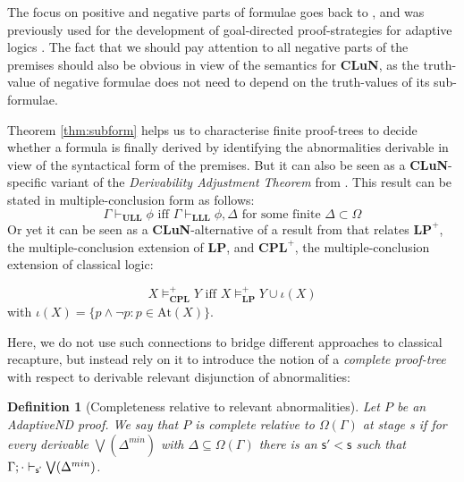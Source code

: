 \documentclass[]{article}
\newtheorem{definition}{Definition}
\newcommand{\TurnPrime}[2]
    { {#1}\vdash_{\textbf{\sf s'}}  {#2}}
\newcommand{\TurnPrimePrime}[2]
    { {#1}\vdash_{\textbf{\sf s''}}  {#2}}
\newcommand{\At}{\ensuremath{\mathrm{At}}}
\begin{document}
The focus on positive and negative parts of formulae goes back to \cite{Sch60}, and was previously used for the development of goal-directed proof-strategies for adaptive logics \cite{Batens:LogiqueAnalyse:2001}. The fact that we should pay attention to all negative parts of the premises should also be obvious in view of the semantics for \textbf{CLuN}, as the truth-value of negative formulae does not need to depend on the truth-values of its sub-formulae.

Theorem \ref{thm:subform} helps us to characterise finite proof-trees to decide whether a formula is finally derived by identifying the abnormalities derivable in view of the syntactical form of the premises. But it can also be seen as a \textbf{CLuN}-specific variant of the \emph{Derivability Adjustment Theorem} from \cite{batens07}. This result can be stated in multiple-conclusion form as follows:
\[
    \Gamma \vdash_{\mathbf{ULL}} \phi \text{ iff } \Gamma \vdash_{\mathbf{LLL}} \phi, \Delta \text{ for some finite } \Delta \subset \Omega
\]
Or yet it can be seen as a \textbf{CLuN}-alternative of a result from \cite{Beall:TheReviewOfSymbolicLogic:2011} that relates $\mathbf{LP}^{+}$, the multiple-conclusion extension of \textbf{LP}, and $\mathbf{CPL}^{+}$, the multiple-conclusion extension of classical logic:

\[
    X \models_{\mathbf{CPL}}^+ Y \text{ iff } X \models_{\mathbf{LP}}^+ Y \cup \iota(X) \tag{LP/CPL}\label{beall}
\]
with $\iota(X) = \{p \wedge \neg p : p \in \At(X)\}$.

Here, we do not use such connections to bridge different approaches to classical recapture, but instead rely on it to  introduce the notion of a \textit{complete proof-tree} with respect to derivable relevant disjunction of abnormalities:

\begin{definition}[Completeness relative to relevant abnormalities]
Let $P$ be an {\sf AdaptiveND} proof. We say that $P$ is complete relative to $\Omega(\Gamma)$ at stage {\sf s} if for every derivable $\bigvee(\Delta^{min})$ with $\Delta\subseteq\Omega(\Gamma)$ there is an $\mathsf{s' < s}$ such that $\TurnPrime{\Gamma;\cdot}{\bigvee(\Delta^{min})}$.

%
\end{definition}
\end{document}

